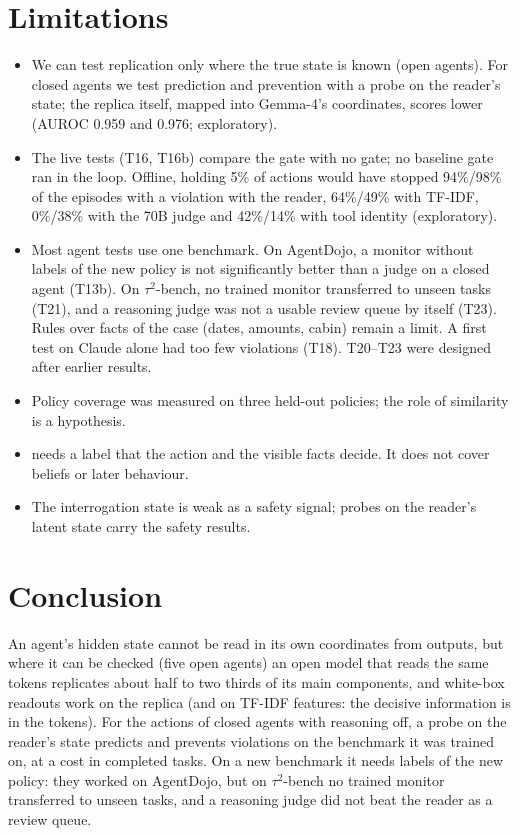 \documentclass{article}
\begin{document}
\section{Limitations}
\label{sec:limits}
\begin{itemize}
\item We can test replication only where the true state is known (open agents). For closed agents we test prediction and prevention with a probe on the reader's state; the replica itself, mapped into Gemma-4's coordinates, scores lower (AUROC 0.959 and 0.976; exploratory).
\item The live tests (T16, T16b) compare the gate with no gate; no baseline gate ran in the loop. Offline, holding 5\% of actions would have stopped 94\%/98\% of the episodes with a violation with the reader, 64\%/49\% with TF-IDF, 0\%/38\% with the 70B judge and 42\%/14\% with tool identity (exploratory).
\item Most agent tests use one benchmark. On AgentDojo, a monitor without labels of the new policy is not significantly better than a judge on a closed agent (T13b). On $\tau^2$-bench, no trained monitor transferred to unseen tasks (T21), and a reasoning judge was not a usable review queue by itself (T23). Rules over facts of the case (dates, amounts, cabin) remain a limit. A first test on Claude alone had too few violations (T18). T20--T23 were designed after earlier results.
\item Policy coverage was measured on three held-out policies; the role of similarity is a hypothesis.
\item {} needs a label that the action and the visible facts decide. It does not cover beliefs or later behaviour.
\item The interrogation state is weak as a safety signal; probes on the reader's latent state carry the safety results.
\end{itemize}

\section{Conclusion}
An agent's hidden state cannot be read in its own coordinates from outputs, but where it can be checked (five open agents) an open model that reads the same tokens replicates about half to two thirds of its main components, and white-box readouts work on the replica (and on TF-IDF features: the decisive information is in the tokens).
For the actions of closed agents with reasoning off, a probe on the reader's state predicts and prevents violations on the benchmark it was trained on, at a cost in completed tasks. On a new benchmark it needs labels of the new policy: they worked on AgentDojo, but on $\tau^2$-bench no trained monitor transferred to unseen tasks, and a reasoning judge did not beat the reader as a review queue.
\end{document}

